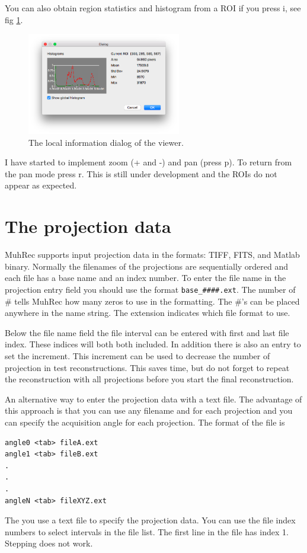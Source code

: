 \documentclass[a4paper]{scrreprt}
\begin{document}
You can also obtain region statistics and histogram from a ROI if you press i, see fig \ref{fig_infodlg}.
\begin{figure}
\centering
\includegraphics[width=0.6\textwidth]{figures3/Viewer_InfoDialog.png}
\caption{The local information dialog of the viewer.}\label{fig_infodlg}
\end{figure}
I have started to implement zoom (+ and -) and pan (press p). To return from the pan mode press r. This is still under development and the ROIs do not appear as expected.






\section{The projection data}
MuhRec supports input projection data in the formats: TIFF, FITS, and Matlab
binary. Normally the filenames of the projections are sequentially ordered and
each file has a base name and an index number. To enter the file name in the
projection entry field you should use the format \verb+base_####.ext+. The
number of \# tells MuhRec how many zeros to use in the formatting. The \#'s can
be placed anywhere in the name string. The extension indicates which file format
to use.

Below the file name field the file interval can be entered with first and last
file index. These indices will both both included. In addition there is also an
entry to set the increment. This increment can be used to decrease the number of
projection in test reconstructions. This saves time, but do not forget to repeat
the reconstruction with all projections before you start the final
reconstruction.

An alternative way to enter the projection data with a text file. The advantage
of this approach is that you can use any filename and for each projection and
you can specify the acquisition angle for each projection.
The format of the file is
\begin{verbatim}
angle0 <tab> fileA.ext
angle1 <tab> fileB.ext
.
.
.
angleN <tab> fileXYZ.ext
\end{verbatim}
The you use a text file to specify the projection data. You can use the file
index numbers to select intervals in the file list. The first line in the file
has index 1. Stepping does not work.
\end{document}
